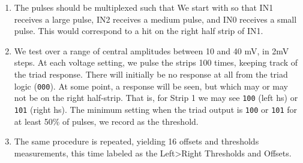 \documentclass[letterpaper]{article}
\begin{document}
\begin{enumerate}

\item The pulses should be multiplexed such that
We start with
so that IN1 receives a large pulse, IN2 receives a medium pulse, and IN0 receives a small pulse.  This would correspond to a hit on the right half strip of IN1.

\item We test over a range of central amplitudes between 10 and 40 mV, in 2mV steps. At each voltage setting, we pulse the strips 100 times, keeping track of the triad response.  There will initially be no response at all from the triad logic (\texttt{000}).  At some point, a response will be seen, but which may or may not be on the right half-strip. That is, for Strip 1 we may see \texttt{100} (left hs) or \texttt{101} (right hs). The minimum setting when the triad output is \texttt{100} or \texttt{101} for at least 50\% of pulses, we record as the threshold.
%
%


\item The same procedure is repeated, yielding 16 offsets and thresholds measurements, this time labeled as the Left>Right Thresholds and Offsets.

\end {enumerate}
\end{document}
